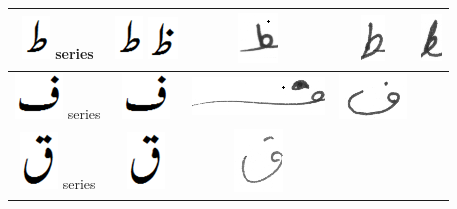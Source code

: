\begin{table}[h]
\begin{tabular}{@{}ccccc@{}}
\hline
\includegraphics[scale=0.25]{tuay_orig} series & \includegraphics[scale=0.25]{tuay_orig} \includegraphics[scale=0.25]{zuay} & \includegraphics[scale=0.25]{tuin} &
\includegraphics[scale=0.20]{tuin2} & 
\includegraphics[scale=0.20]{zuin}\\ 
\hline
\includegraphics[scale=0.20]{Fay_orig} series & \includegraphics[scale=0.20]{Fay_orig} & \includegraphics[scale=0.25]{22} &
\includegraphics[scale=0.20]{23} & \\ 
\hline
\includegraphics[scale=0.25]{qaaf_orig} series & \includegraphics[scale=0.25]{qaaf_orig} & \includegraphics[scale=0.20]{24} &

\end{tabular}
\end{table}
